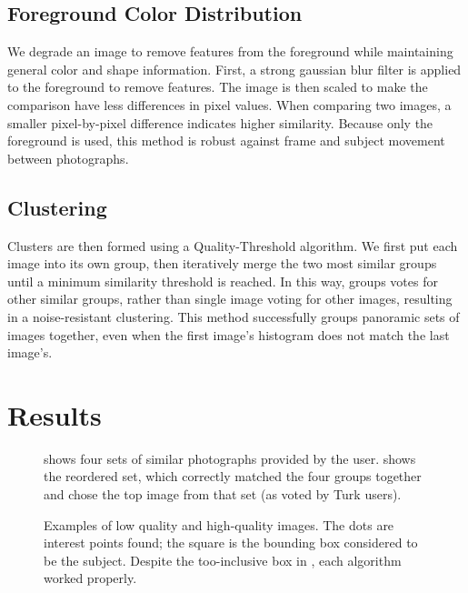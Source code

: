 \documentclass{article}
\begin{document}
\subsection{Foreground Color Distribution}
We degrade an image to remove features from the foreground while maintaining general color and shape information. First, a strong gaussian blur filter is applied to the foreground to remove features. The image is then scaled to make the comparison have less differences in pixel values. When comparing two images, a smaller pixel-by-pixel difference indicates higher similarity. Because only the foreground is used, this method is robust against frame and subject movement between photographs.

\subsection{Clustering}
Clusters are then formed using a Quality-Threshold algorithm. We first put each image into its own group, then iteratively merge the two most similar groups until a minimum similarity threshold is reached. In this way, groups votes for other similar groups, rather than single image voting for other images, resulting in a noise-resistant clustering. This method successfully groups panoramic sets of images together, even when the first image's histogram does not match the last image's. %


\section{Results}

\begin{figure*}[t!]
\centering
{}
\caption{ shows four sets of similar photographs provided by the user.  shows the reordered set, which correctly matched the four groups together and chose the top image from that set (as voted by Turk users).}
\label{fig:ResultSorting}
\end{figure*}

\begin{figure*}[t!]
\centering
{}
\caption{Examples of  low quality and  high-quality images. The dots are interest points found; the square is the bounding box considered to be the subject. Despite the too-inclusive box in , each algorithm worked properly.}
\label{fig:Examples}
\end{figure*}
\end{document}
